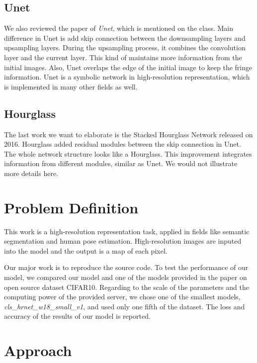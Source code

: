\documentclass[10pt,twocolumn,letterpaper]{article}
\begin{document}
\subsection{Unet}

We also reviewed the paper of \emph{Unet}, which is mentioned on the class.\cite{ronneberger2015unet}
Main difference in Unet is add skip connection between the downsampling layers and upsampling layers.
During the upsampling process,
it combines the convolution layer and the current layer.
This kind of maintains more information from the initial images.
Also, Unet overlaps the edge of the initial image to keep the fringe information.
Unet is a symbolic network in high-resolution representation,
which is implemented in many other fields as well.

\subsection{Hourglass}

The last work we want to elaborate is the Stacked Hourglass Network released on 2016.\cite{alej2016stacked}
Hourglass added residual modules between the skip connection in Unet.
The whole network structure looks like a Hourglass.
This improvement integrates information from different modules,
similar as Unet.
We would not illustrate more details here.

\section{Problem Definition}

This work is a high-resolution representation task,
applied in fields  like semantic segmentation and human pose estimation.
High-resolution images are inputed into the model and the output is a map of each pixel.

Our major work is to reproduce the source code.
To test the performance of our model,
we compared our model and one of the models provided in the paper on open source dataset CIFAR10.
Regarding to the scale of the parameters and the computing power of the provided server,
we chose one of the smallest models, \emph{cls\_hrnet\_w18\_small\_v1}, and used only one fifth of the dataset.
The loss and accuracy of the results of our model is reported.

\section{Approach}
\end{document}
